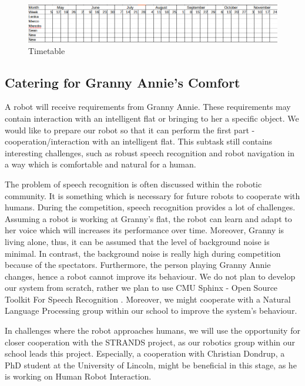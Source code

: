 \documentclass[conference]{IEEEtran}
\begin{document}
\begin{figure}[!htb]
\centering
\includegraphics[width=\textwidth]{timetable.png}
\caption{Timetable}
\label{fig:plan}
\end{figure}

\subsection{Catering for Granny Annie’s Comfort}

A robot will receive requirements from Granny Annie. These requirements may contain interaction with an intelligent flat or bringing to her a specific object. We would like to prepare our robot so that it can perform the first part - cooperation/interaction with an intelligent flat. This subtask still contains interesting challenges, such as robust speech recognition and robot navigation in a way which is comfortable and natural for a human. %

The problem of speech recognition is often discussed within the robotic community. It is something which is necessary for future robots to cooperate with humans. During the competition, speech recognition provides a lot of challenges. Assuming a robot is working at Granny's flat, the robot can learn and adapt to her voice which will increases its performance over time. Moreover, Granny is living alone, thus, it can be assumed that the level of background noise is minimal. In contrast, the background noise is really high during competition because of the spectators. Furthermore, the person playing Granny Annie changes, hence a robot cannot improve its behaviour. We do not plan to develop our system from scratch, rather we plan to use CMU Sphinx - Open Source Toolkit For Speech Recognition \cite{cmu}. %
Moreover, we might cooperate with a Natural Language Processing group within our school to improve the system's behaviour.

In challenges where the robot approaches humans, we will use the opportunity for closer cooperation with the STRANDS \cite{strands} project, as our robotics group within our school leads this project. Especially, a cooperation with Christian Dondrup, a PhD student at the University of Lincoln, might be beneficial in this stage, as he is working on Human Robot Interaction.
\end{document}
